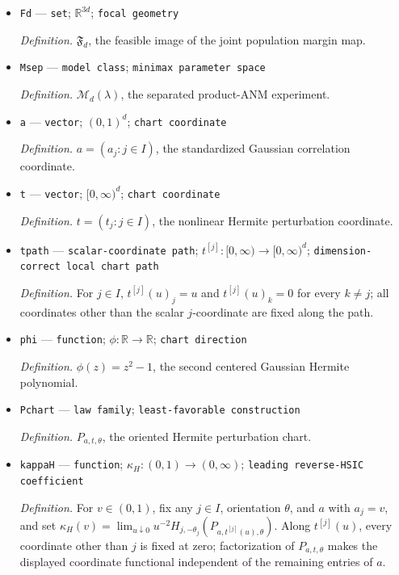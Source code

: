 \documentclass{article}
\begin{document}
\begin{itemize}
  \item \texttt{Fd} --- \texttt{set}; \(\mathbb R^{3d}\); \texttt{focal geometry}
  \par\smallskip\noindent\emph{Definition.} \(\mathfrak F_d\), the feasible image of the joint population margin map.
  \item \texttt{Msep} --- \texttt{model class}; \texttt{minimax parameter space}
  \par\smallskip\noindent\emph{Definition.} \(\mathcal M_d(\lambda)\), the separated product-ANM experiment.
  \item \texttt{a} --- \texttt{vector}; \((0,1)^d\); \texttt{chart coordinate}
  \par\smallskip\noindent\emph{Definition.} \(a=(a_j:j\in I)\), the standardized Gaussian correlation coordinate.
  \item \texttt{t} --- \texttt{vector}; \([0,\infty)^d\); \texttt{chart coordinate}
  \par\smallskip\noindent\emph{Definition.} \(t=(t_j:j\in I)\), the nonlinear Hermite perturbation coordinate.
  \item \texttt{tpath} --- \texttt{scalar-\allowbreak{}coordinate path}; \(t^{[j]}:[0,\infty)\to[0,\infty)^d\); \texttt{dimension-\allowbreak{}correct local chart path}
  \par\smallskip\noindent\emph{Definition.} For \(j\in I\), \(t^{[j]}(u)_j=u\) and \(t^{[j]}(u)_k=0\) for every \(k\ne j\); all coordinates other than the scalar \(j\)-coordinate are fixed along the path.
  \item \texttt{phi} --- \texttt{function}; \(\phi:\mathbb R\to\mathbb R\); \texttt{chart direction}
  \par\smallskip\noindent\emph{Definition.} \(\phi(z)=z^2-1\), the second centered Gaussian Hermite polynomial.
  \item \texttt{Pchart} --- \texttt{law family}; \texttt{least-\allowbreak{}favorable construction}
  \par\smallskip\noindent\emph{Definition.} \(P_{a,t,\theta}\), the oriented Hermite perturbation chart.
  \item \texttt{kappaH} --- \texttt{function}; \(\kappa_H:(0,1)\to(0,\infty)\); \texttt{leading reverse-\allowbreak{}HSIC coefficient}
  \par\smallskip\noindent\emph{Definition.} For \(v\in(0,1)\), fix any \(j\in I\), orientation \(\theta\), and \(a\) with \(a_j=v\), and set \(\kappa_H(v)=\lim_{u\downarrow0}u^{-2}H_{j,-\theta_j}(P_{a,t^{[j]}(u),\theta})\). Along \(t^{[j]}(u)\), every coordinate other than \(j\) is fixed at zero; factorization of \(P_{a,t,\theta}\) makes the displayed coordinate functional independent of the remaining entries of \(a\).

\end{itemize}
\end{document}
